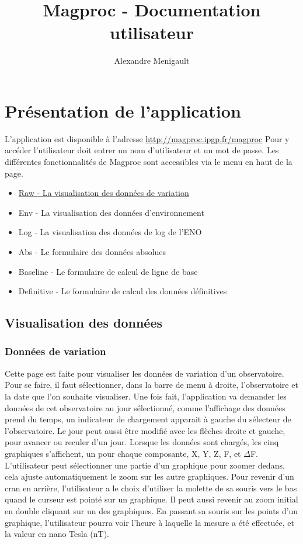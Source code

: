 \documentclass[10pt,a4paper]{report}
\author{Alexandre Menigault}
\title{Magproc - Documentation utilisateur}
\begin{document}
\maketitle

\tableofcontents

\chapter{Présentation de l'application}


L'application est disponible à l'adresse \url{http://magproc.ipgp.fr/magproc}
Pour y accéder l'utilisateur doit entrer un nom d'utilisateur et un mot de passe.
Les différentes fonctionnalités de Magproc sont accessibles via le menu en haut de la page.
\linebreak
\begin{itemize}
\item \hyperref[sec:raw]{Raw - La visualisation des données de variation}
\item Env - La visualisation des données d'environnement
\item Log - La visualisation des données de log de l'ENO
\item Abs - Le formulaire des données absolues
\item Baseline - Le formulaire de calcul de ligne de base
\item Definitive - Le formulaire de calcul des données définitives
\end{itemize}

\section{Visualisation des données}
\subsection{Données de variation}
\label{sec:raw}
Cette page est faite pour visualiser les données de variation d'un observatoire.
\linebreak 
Pour se faire, il faut sélectionner, dans la barre de menu à droite, l'observatoire et la date que l'on souhaite visualiser. Une fois fait, l'application va demander les données de cet observatoire au jour sélectionné, comme l'affichage des données prend du temps, un indicateur de chargement apparait à gauche du sélecteur de l'observatoire. Le jour peut aussi être modifié avec les flèches droite et gauche, pour avancer ou reculer d'un jour. Lorsque les données sont chargés, les cinq graphiques s'affichent, un pour chaque composante, X, Y, Z, F, et $\Delta$F.
\linebreak
L'utilisateur peut sélectionner une partie d'un graphique pour zoomer dedans, cela ajuste automatiquement le zoom sur les autre graphiques. Pour revenir d'un cran en arrière, l'utilisateur a le choix d'utiliser la molette de sa souris vers le bas quand le curseur est pointé sur un graphique. Il peut aussi revenir au zoom initial en double cliquant sur un des graphiques. En passant sa souris sur les points d'un graphique, l'utilisateur pourra voir l'heure à laquelle la mesure a été effectuée, et la valeur en nano Tesla (nT).
\end{document}
